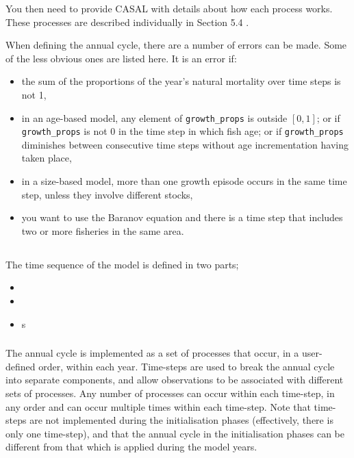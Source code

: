 You then need to provide CASAL with details about how each process works. These processes are described individually in \KL Section 5.4 \KLend. 

When defining the annual cycle, there are a number of errors can be made. Some of the less obvious ones are listed here. It is an error if: 

\begin{itemize}
\item	the sum of the proportions of the year’s natural mortality over time steps is not 1,
\item	in an age-based model, any element of \texttt{growth\_props} is outside $[0,1]$; or if \texttt{growth\_props} is not 0 in the time step in which fish age; or if \texttt{growth\_props} diminishes between consecutive time steps without age incrementation having taken place,
\item	in a size-based model, more than one growth episode occurs in the same time step, unless they involve different stocks,
\item  you want to use the Baranov equation and there is a time step that includes two or more fisheries in the same area.
\end{itemize}


\subsection{}

The time sequence of the model is defined in two parts;
\begin{itemize}
  \item {}
  \item {}
  \item {}s
\end{itemize}

\subsubsection{}

The annual cycle is implemented as a set of processes that occur, in a user-defined order, within each year. Time-steps are used to break the annual cycle into separate components, and allow observations to be associated with different sets of processes. Any number of processes can occur within each time-step, in any order and can occur multiple times within each time-step. Note that time-steps are not implemented during the initialisation phases (effectively, there is only one time-step), and that the annual cycle in the initialisation phases can be different from that which is applied during the model years.

